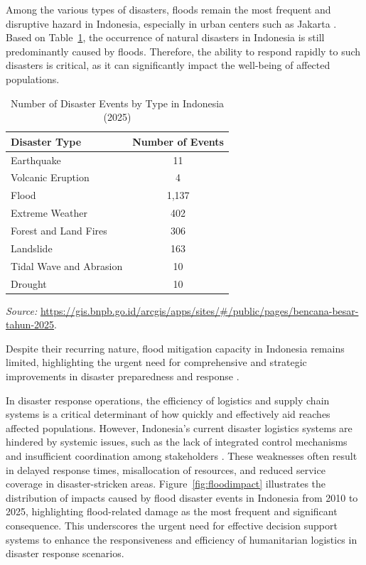 \documentclass[journal,final,a4paper,twoside,11pt]{IEEEtran}
\begin{document}
Among the various types of disasters, floods remain the most frequent and disruptive hazard in Indonesia, especially in urban centers such as Jakarta \cite{sholihah2020analysis}. 
Based on Table~\ref{tab:disaster2025}, the occurrence of natural disasters in Indonesia is still predominantly caused by floods. Therefore, the ability to respond rapidly to such disasters is critical, as it can significantly impact the well-being of affected populations.


\begin{table}[htbp]
\caption{Number of Disaster Events by Type in Indonesia (2025)}
\begin{center}
\begin{tabular}{|l|c|}
\hline
\textbf{Disaster Type} & \textbf{Number of Events} \\
\hline
Earthquake & 11 \\
\hline
Volcanic Eruption & 4 \\
\hline
Flood & 1,137 \\
\hline
Extreme Weather & 402 \\
\hline
Forest and Land Fires & 306 \\
\hline
Landslide & 163 \\
\hline
Tidal Wave and Abrasion & 10 \\
\hline
Drought & 10 \\
\hline
\end{tabular}
\end{center}
\vspace{0.2cm}
\footnotesize{\textit{Source:} \url{https://gis.bnpb.go.id/arcgis/apps/sites/#/public/pages/bencana-besar-tahun-2025}.}
\label{tab:disaster2025}
\end{table}


Despite their recurring nature, flood mitigation capacity in Indonesia remains limited, highlighting the urgent need for comprehensive and strategic improvements in disaster preparedness and response \cite{riza2020advancing}.

In disaster response operations, the efficiency of logistics and supply chain systems is a critical determinant of how quickly and effectively aid reaches affected populations. However, Indonesia's current disaster logistics systems are hindered by systemic issues, such as the lack of integrated control mechanisms and insufficient coordination among stakeholders \cite{rustian2021implementation}. These weaknesses often result in delayed response times, misallocation of resources, and reduced service coverage in disaster-stricken areas. Figure~\ref{fig:floodimpact} illustrates the distribution of impacts caused by flood disaster events in Indonesia from 2010 to 2025, highlighting flood-related damage as the most frequent and significant consequence. This underscores the urgent need for effective decision support systems to enhance the responsiveness and efficiency of humanitarian logistics in disaster response scenarios.
\end{document}
